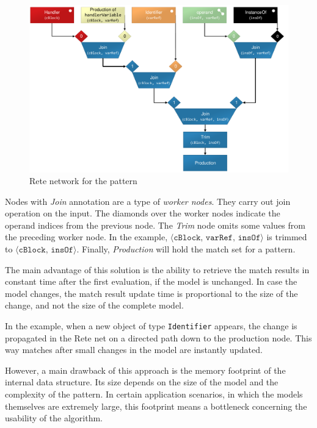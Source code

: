 \begin{figure}[!htp]
	\centering
	\includegraphics[width=\textwidth]{figures/pdfs/rete-catchProblemFinder-layout.pdf}
	\caption{Rete network for the \catchproblem pattern}
	\label{fig:example-rete}
\end{figure}


Nodes with \emph{Join} annotation are a type of \emph{worker nodes}. They carry out join operation on the input. The diamonds over the worker nodes indicate the operand indices from the previous node. The \emph{Trim} node omits some values from the preceding worker node. In the example, $\langle \texttt{cBlock, varRef, insOf} \rangle $ is trimmed to $\langle \texttt{cBlock, insOf} \rangle $. Finally, \emph{Production} will hold the match set for a pattern.


The main advantage of this solution is the ability to retrieve the match results in constant time after the first evaluation, if the model is unchanged. In case the model changes, the match result update time is proportional to the size of the change, and not the size of the complete model.

In the example, when a new object of type \texttt{Identifier} appears, the change is propagated in the Rete net on a directed path down to the production node. This way matches after small changes in the model are instantly updated.

However, a main drawback of this approach is the memory footprint of the internal data structure. Its size depends on the size of the model and the complexity of the pattern. In certain application scenarios, in which the models themselves are extremely large, this footprint means a bottleneck concerning the usability of the algorithm.


